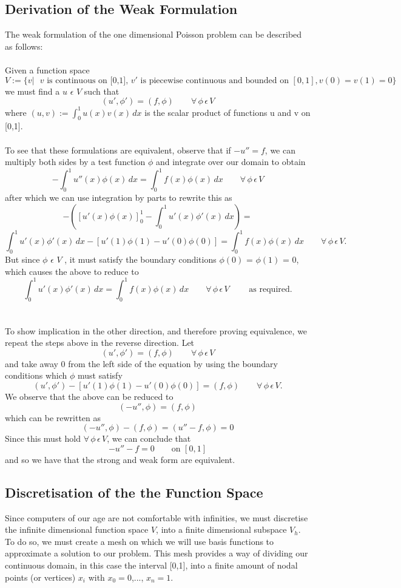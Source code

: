 \documentclass{article}
\begin{document}
\subsection{Derivation of the Weak Formulation}
The weak formulation of the one dimensional Poisson problem can be described as follows:\\
\\
Given a function space 
$$ V := \{v| \textrm{ $v$ is continuous on [0,1], $v'$ is piecewise continuous and bounded on } [0,1],  v(0) = v(1) = 0 \} $$
we must find a $u$ $\epsilon$ $V$ such that 
\[(u',\phi ') = (f , \phi) \qquad\forall\,\phi\, \epsilon\, V\]
where 
$(u,v) := \int_{0}^{1} u(x)v(x) \,dx $
is the scalar product of functions u and v on [0,1].\\
\\
To see that these formulations are equivalent, observe that if $-u'' = f$, we can multiply both sides by a test function $\phi$ and integrate over our domain to obtain 
\[-\int_{0}^{1} u''(x)\phi(x) \,dx = \int_{0}^{1} f(x)\phi(x) \,dx \qquad\forall\,\phi\, \epsilon\, V\]
after which we can use integration by parts to rewrite this as
\[- ( [u'(x)\phi(x)]_0^1 - \int_{0}^{1} u'(x)\phi'(x) \,dx ) = \]
\[\int_{0}^{1} u'(x)\phi'(x) \,dx - [ u'(1)\phi(1) - u'(0)\phi(0) ] = \int_{0}^{1} f(x)\phi(x) \,dx
\qquad\forall\,\phi\, \epsilon\, V. \]
But since $\phi$ $\epsilon$ $V$ , it must satisfy the boundary conditions $\phi(0)$ = $\phi(1)$ = 0, which causes the above to reduce to
\[\int_{0}^{1} u'(x)\phi'(x) \,dx  = \int_{0}^{1} f(x)\phi(x) \,dx \qquad\forall\,\phi\, \epsilon\, V \qquad\textrm{ as required.}\] 
\\
\\
To show implication in the other direction, and therefore proving equivalence, we repeat the steps above in the reverse direction. Let 
\[(u',\phi ') = (f , \phi) \qquad\forall\,\phi\, \epsilon\, V  \]
and take away 0 from the left side of the equation by using the boundary conditions which $\phi$ must satisfy
\[(u',\phi ') - [u'(1)\phi(1) - u'(0)\phi(0)] = (f , \phi) \qquad\forall\,\phi\, \epsilon\, V.  \]
We observe that the above can be reduced to 
\[(-u'',\phi ) = (f , \phi) \]
which can be rewritten as 
\[(-u'',\phi ) - (f , \phi) = (u'' - f,\phi )   = 0 \]
Since this must hold $\forall\,\phi\, \epsilon\, V$, we can conclude that
\[-u'' - f = 0 \qquad \textrm{on }[0,1]\]
and so we have that the strong and weak form are equivalent. 
\subsection{Discretisation of the the Function Space}
Since computers of our age are not comfortable with infinities, we must discretise the infinite dimensional function space $V$, into a finite dimensional subspace $V_h$. To do so, we must create a mesh on which we will use basis functions to approximate a solution to our problem. This mesh provides a way of dividing our continuous domain, in this case the interval [0,1], into a finite amount of nodal points (or vertices) $x_i$ with 
$x_0 = 0$,..., $x_{n} = 1$.
\end{document}
